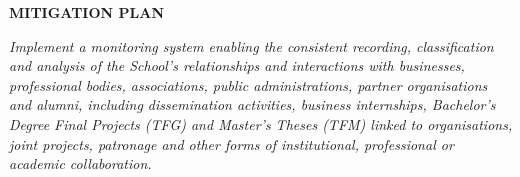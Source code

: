 \documentclass[11pt,a4paper]{scrreprt}
\begin{document}
\begin{tcolorbox}[mitbox]
{\footnotesize\sffamily\bfseries\color{green!40!black} MITIGATION PLAN}\par{}
\end{tcolorbox}
\vspace{8pt}

\newpage
{}
{\small\color{mutedcolor}\itshape Implement a monitoring system enabling the consistent recording, classification and analysis of the School's relationships and interactions with businesses, professional bodies, associations, public administrations, partner organisations and alumni, including dissemination activities, business internships, Bachelor's Degree Final Projects (TFG) and Master's Theses (TFM) linked to organisations, joint projects, patronage and other forms of institutional, professional or academic collaboration.  }\par\vspace{6pt}
\end{document}
